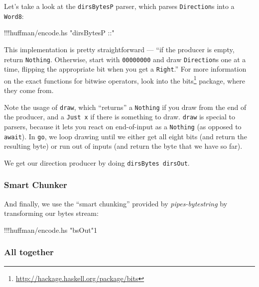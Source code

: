 \documentclass[]{article}
\newenvironment{Shaded}{}{}
\newcommand{\DecValTok}[1]{\textcolor[rgb]{0.25,0.63,0.44}{{#1}}}
\newcommand{\StringTok}[1]{\textcolor[rgb]{0.25,0.44,0.63}{{#1}}}
\newcommand{\FunctionTok}[1]{\textcolor[rgb]{0.02,0.16,0.49}{{#1}}}
\newcommand{\NormalTok}[1]{{#1}}
\renewcommand{\href}[2]{#2\footnote{\url{#1}}}
\begin{document}
Let's take a look at the \texttt{dirsBytesP} parser, which parses
\texttt{Direction}s into a \texttt{Word8}:

\begin{Shaded}
\begin{Highlighting}[]
\FunctionTok{!!!}\NormalTok{huffman}\FunctionTok{/}\NormalTok{encode}\FunctionTok{.}\NormalTok{hs }\StringTok{"dirsBytesP ::"}
\end{Highlighting}
\end{Shaded}

This implementation is pretty straightforward --- ``if the producer is
empty, return \texttt{Nothing}. Otherwise, start with \texttt{00000000}
and draw \texttt{Direction}s one at a time, flipping the appropriate bit
when you get a \texttt{Right}.'' For more information on the exact
functions for bitwise operators, look into the
\href{http://hackage.haskell.org/package/bits}{bits} package, where they
come from.

Note the usage of \texttt{draw}, which ``returns'' a \texttt{Nothing} if
you draw from the end of the producer, and a \texttt{Just\ x} if there
is something to draw. \texttt{draw} is special to parsers, because it
lets you react on end-of-input as a \texttt{Nothing} (as opposed to
\texttt{await}). In \texttt{go}, we loop drawing until we either get all
eight bits (and return the resulting byte) or run out of inputs (and
return the byte that we have so far).

We get our direction producer by doing \texttt{dirsBytes\ dirsOut}.

\subsubsection{Smart Chunker}\label{smart-chunker}

And finally, we use the ``smart chunking'' provided by
\emph{pipes-bytestring} by transforming our bytes stream:

\begin{Shaded}
\begin{Highlighting}[]
\FunctionTok{!!!}\NormalTok{huffman}\FunctionTok{/}\NormalTok{encode}\FunctionTok{.}\NormalTok{hs }\StringTok{"bsOut"}\DecValTok{1}
\end{Highlighting}
\end{Shaded}

\subsubsection{All together}\label{all-together}
\end{document}
